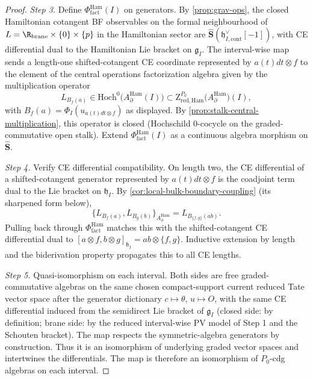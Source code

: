 \documentclass[11pt]{memoir}
\begin{document}
\begin{proof}
  \emph{Step 3.} Define $\Phi^{\mathrm{Ham}}_{\mathrm{fact}}(I)$ on
  generators. By \ref{prop:grav-ops}, the closed Hamiltonian
  cotangent BF observables on the formal neighbourhood of
  \(L=\R_{\mathrm{brane}}\times\{0\}\times\{p\}\) in the Hamiltonian sector are
  $\widehat{\mathbf S}(\mathfrak h^{\vee}_{I,\mathrm{cont}}[-1])$,
  with CE differential dual to the Hamiltonian Lie bracket on
  $\mathfrak g_I$. The interval-wise map sends a length-one
  shifted-cotangent CE coordinate represented by \(a(t)dt\otimes f\)
  to the element of the central operations factorization algebra given
  by the multiplication operator
  $$L_{B_f(a)}\in\mathrm{Hoch}^0\bigl(A_\partial^{\mathrm{Ham}}(I)\bigr)
    \subset\mathrm Z^{P_0}_{\mathrm{red,Ham}}\bigl(A_\partial^{\mathrm{Ham}}\bigr)(I),$$
  with \(B_f(a)=\Phi_I(u_{a(t)dt\otimes f})\) as displayed. By
  \ref{prop:stalk-central-multiplication}, this operator is closed
  (Hochschild $0$-cocycle on the graded-commutative open stalk).
  Extend $\Phi^{\mathrm{Ham}}_{\mathrm{fact}}(I)$ as a continuous
  algebra morphism on $\widehat{\mathbf S}$.

  \emph{Step 4.} Verify CE differential compatibility. On length two,
  the CE differential of a shifted-cotangent generator
  represented by \(a(t)dt\otimes f\) is the coadjoint term dual to the Lie bracket on
  $\mathfrak h_I$. By
  \ref{cor:local-bulk-boundary-coupling} (its sharpened form below),
  $$\{L_{B_f(a)},L_{B_g(b)}\}_{A_\partial^{\mathrm{Ham}}}
    =L_{B_{\{f,g\}}(ab)}.$$
  Pulling back through $\Phi^{\mathrm{Ham}}_{\mathrm{fact}}$ matches
  this with the shifted-cotangent CE differential dual to
  $[a\otimes f,b\otimes g]_{\mathfrak h_I}=ab\otimes\{f,g\}$.
  Inductive extension by length and the biderivation property
  propagates this to all CE lengths.

  \emph{Step 5.} Quasi-isomorphism on each interval. Both sides are
  free graded-commutative algebras on the same chosen compact-support
  current reduced Tate vector
  space after the generator dictionary
  $c\mapsto\theta$, $u\mapsto O$, with the same CE
  differential induced from the semidirect Lie bracket of $\mathfrak g_I$
	  (closed side: by definition; brane side: by the reduced
	  interval-wise PV model of Step 1 and the Schouten bracket). The map
  respects the symmetric-algebra generators by construction. Thus it
  is an isomorphism of underlying graded vector spaces and
  intertwines the differentials. The map is therefore an isomorphism
  of $P_0$-cdg algebras on each interval.


\end{proof}
\end{document}
